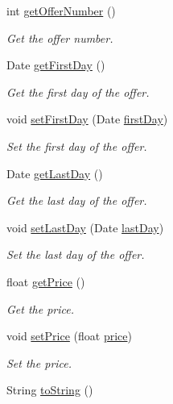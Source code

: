 \begin{DoxyCompactItemize}
int \mbox{\hyperlink{classdomain_1_1Offer_ab9e27c474ec6819a27eac1847d876c3a}{get\+Offer\+Number}} ()
\begin{DoxyCompactList}\small\item\em Get the offer number. \end{DoxyCompactList}\item 
Date \mbox{\hyperlink{classdomain_1_1Offer_ae13ac55ba469cb34e004d6aff68430fb}{get\+First\+Day}} ()
\begin{DoxyCompactList}\small\item\em Get the first day of the offer. \end{DoxyCompactList}\item 
void \mbox{\hyperlink{classdomain_1_1Offer_aca5c8e3d34e700c8e51d1c9a0685e68f}{set\+First\+Day}} (Date \mbox{\hyperlink{classdomain_1_1Offer_ac30c7d7ca38555fecc523259c15bd6b0}{first\+Day}})
\begin{DoxyCompactList}\small\item\em Set the first day of the offer. \end{DoxyCompactList}\item 
Date \mbox{\hyperlink{classdomain_1_1Offer_a8bf48365a8fc185dbdcaac80a9d84444}{get\+Last\+Day}} ()
\begin{DoxyCompactList}\small\item\em Get the last day of the offer. \end{DoxyCompactList}\item 
void \mbox{\hyperlink{classdomain_1_1Offer_a52363278771059c51820160889c2bed1}{set\+Last\+Day}} (Date \mbox{\hyperlink{classdomain_1_1Offer_a4d415274c0e120dd3e66e4ad46d7e2b2}{last\+Day}})
\begin{DoxyCompactList}\small\item\em Set the last day of the offer. \end{DoxyCompactList}\item 
float \mbox{\hyperlink{classdomain_1_1Offer_a4ebf9c6f415709b527e006fdffa3a0c3}{get\+Price}} ()
\begin{DoxyCompactList}\small\item\em Get the price. \end{DoxyCompactList}\item 
void \mbox{\hyperlink{classdomain_1_1Offer_a8bd526902732e030571b6889c5507f4c}{set\+Price}} (float \mbox{\hyperlink{classdomain_1_1Offer_a194cfe9363c5bd9e745f56978b03e7fd}{price}})
\begin{DoxyCompactList}\small\item\em Set the price. \end{DoxyCompactList}\item 
String \mbox{\hyperlink{classdomain_1_1Offer_a8838b2d4c6616394f1829d4dc5572952}{to\+String}} ()
\end{DoxyCompactItemize}

